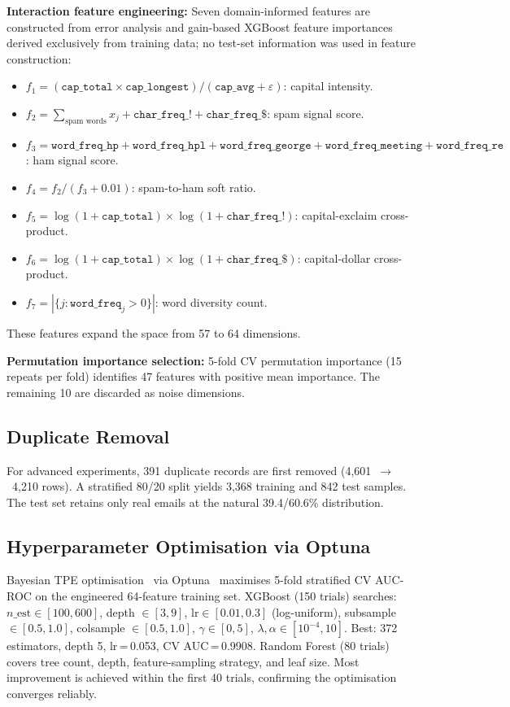 \documentclass[conference]{IEEEtran}
\begin{document}
\textbf{Interaction feature engineering:} Seven domain-informed
features are constructed from error analysis and gain-based
XGBoost feature importances derived exclusively from training
data; no test-set information was used in feature construction:
\begin{itemize}
  \item $f_1=(\texttt{cap\_total}\times\texttt{cap\_longest})
        /(\texttt{cap\_avg}+\varepsilon)$: capital intensity.
  \item $f_2=\sum_{\text{spam words}}x_j
        +\texttt{char\_freq\_!}
        +\texttt{char\_freq\_\$}$: spam signal score.
  \item $f_3=\texttt{word\_freq\_hp}+\texttt{word\_freq\_hpl}
        +\texttt{word\_freq\_george}+\texttt{word\_freq\_meeting}
        +\texttt{word\_freq\_re}$: ham signal score.
  \item $f_4=f_2/(f_3+0.01)$: spam-to-ham soft ratio.
  \item $f_5=\log(1+\texttt{cap\_total})
        \times\log(1+\texttt{char\_freq\_!})$:
        capital-exclaim cross-product.
  \item $f_6=\log(1+\texttt{cap\_total})
        \times\log(1+\texttt{char\_freq\_\$})$:
        capital-dollar cross-product.
  \item $f_7=|\{j:\texttt{word\_freq}_j>0\}|$:
        word diversity count.
\end{itemize}
These features expand the space from 57 to 64 dimensions.

\textbf{Permutation importance selection:} 5-fold CV
permutation importance (15 repeats per fold) identifies 47
features with positive mean importance. The remaining 10 are
discarded as noise dimensions.

\subsection{Duplicate Removal}

For advanced experiments, 391 duplicate records are first
removed (4,601~$\to$~4,210 rows). A stratified 80/20 split
yields 3,368 training and 842 test samples. The test set
retains only real emails at the natural 39.4/60.6\%
distribution.

\subsection{Hyperparameter Optimisation via Optuna}

Bayesian TPE optimisation~\cite{ref11} via Optuna~\cite{ref13} maximises
5-fold stratified CV AUC-ROC on the engineered 64-feature
training set. XGBoost (150 trials) searches: $n\_\text{est}\in
[100,600]$, depth $\in[3,9]$, $\text{lr}\in[0.01,0.3]$
(log-uniform), subsample $\in[0.5,1.0]$, colsample
$\in[0.5,1.0]$, $\gamma\in[0,5]$, $\lambda,\alpha
\in[10^{-4},10]$. Best: 372 estimators, depth 5,
lr\,=\,0.053, CV AUC\,=\,0.9908. Random Forest (80 trials) covers
tree count, depth, feature-sampling strategy, and leaf size.
Most improvement is achieved within the first 40 trials,
confirming the optimisation converges reliably.
\end{document}
